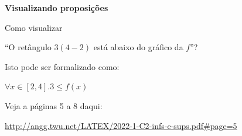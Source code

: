 \documentclass[oneside,12pt]{article}
\begin{document}
\newpage


{\bf Visualizando proposições}

Como visualizar

``O retângulo $3(4-2)$ está abaixo do gráfico da $f$''?

\ssk


Isto pode ser formalizado como:

$∀x∈[2,4].3≤f(x)$

\ssk

Veja a páginas 5 a 8 daqui:

\ssk

{\footnotesize

\url{http://angg.twu.net/LATEX/2022-1-C2-infs-e-sups.pdf#page=5}

}

\ssk




\newpage

% 
% 
% 
% 
% 




\end{document}
